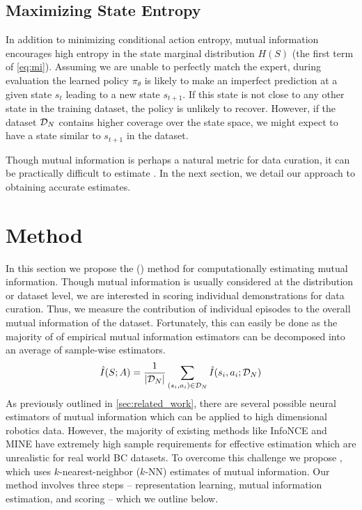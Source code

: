 \subsection{Maximizing State Entropy}
In addition to minimizing conditional action entropy, mutual information encourages high entropy in the state marginal distribution $H(S)$ (the first term of \cref{eq:mi}). Assuming we are unable to perfectly match the expert, during evaluation the learned policy $\pi_\theta$ is likely to make an imperfect prediction at a given state $s_t$ leading to a new state $s_{t+1}$. If this state is not close to any other state in the training dataset, the policy is unlikely to recover. However, if the dataset $\mathcal{D}_N$ contains higher coverage over the state space, we might expect to have a state similar to $s_{t+1}$ in the dataset. 

Though mutual information is perhaps a natural metric for data curation, it can be practically difficult to estimate \citep{beyond-normal-2023}. In the next section, we detail our approach to obtaining accurate estimates.

\section{Method}
\label{sec:method:score}

In this section we propose the \fullname (\abv) method for computationally estimating mutual information. Though mutual information is usually considered at the distribution or dataset level, we are interested in scoring individual demonstrations for data curation. Thus, we measure the contribution of individual episodes to the overall mutual information of the dataset. Fortunately, this can easily be done as the majority of of empirical mutual information estimators can be decomposed into an average of sample-wise estimators. 
\begin{equation}
    \hat{I}(S;A) = \frac{1}{|\mathcal{D}_N|} \sum_{(s_i,a_i) \in \mathcal{D}_N} \hat{I}(s_i, a_i ; \mathcal{D}_N)
    \label{eq:empirical_mi}
\end{equation}
As previously outlined in \cref{sec:related_work}, there are several possible neural estimators of mutual information which can be applied to high dimensional robotics data. However, the majority of existing methods like InfoNCE \citep{oord2018representation} and MINE \citep{belghazi2018mine} have extremely high sample requirements for effective estimation which are unrealistic for real world BC datasets. To overcome this challenge we propose \fullname, which uses $k$-nearest-neighbor ($k$-NN) estimates of mutual information. Our method involves three steps -- representation learning, mutual information estimation, and scoring -- which we outline below.


